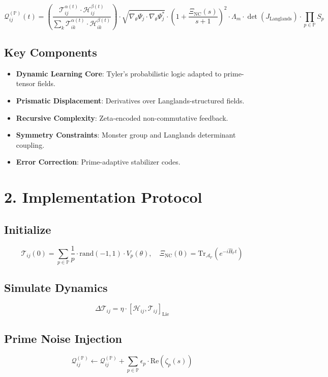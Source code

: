 \documentclass{article}
\theoremstyle{plain}
\begin{document}
\[
\mathcal{Q}_{ij}^{(\mathbb{P})}(t) = 
\left( \frac{\mathcal{T}_{ij}^{\alpha(t)} \cdot \mathcal{H}_{ij}^{\beta(t)}}{\sum_k \mathcal{T}_{ik}^{\alpha(t)} \cdot \mathcal{H}_{ik}^{\beta(t)}} \right)
\cdot 
\sqrt{\nabla_{\theta} \Psi_j \cdot \nabla_{\theta} \Psi_j^*}
\cdot 
\left(1 + \frac{\Xi_{\text{NC}}(s)}{s+1}\right)^2
\cdot 
\Lambda_m \cdot \det(J_{\text{Langlands}})
\cdot 
\prod_{p \in \mathbb{P}} S_p
\]

\subsection*{Key Components}
\begin{itemize}
  \item \textbf{Dynamic Learning Core}: Tyler's probabilistic logic adapted to prime-tensor fields.
  \item \textbf{Prismatic Displacement}: Derivatives over Langlands-structured fields.
  \item \textbf{Recursive Complexity}: Zeta-encoded non-commutative feedback.
  \item \textbf{Symmetry Constraints}: Monster group and Langlands determinant coupling.
  \item \textbf{Error Correction}: Prime-adaptive stabilizer codes.
\end{itemize}

\section*{2. Implementation Protocol}
\subsection*{Initialize}
\[
\mathcal{T}_{ij}(0) = \sum_{p \in \mathbb{P}} \frac{1}{p} \cdot \text{rand}(-1, 1) \cdot V_p(\theta), \quad \Xi_{\text{NC}}(0) = \text{Tr}_{\mathcal{A}_{\mathbb{P}}}(e^{-i \hat{H}_{\mathbb{P}} t})
\]

\subsection*{Simulate Dynamics}
\[
\Delta \mathcal{T}_{ij} = \eta \cdot [\mathcal{H}_{ij}, \mathcal{T}_{ij}]_{\text{Lie}}
\]

\subsection*{Prime Noise Injection}
\[
\mathcal{Q}_{ij}^{(\mathbb{P})} \leftarrow \mathcal{Q}_{ij}^{(\mathbb{P})} + \sum_{p \in \mathbb{P}} \epsilon_p \cdot \text{Re}(\zeta_p(s))
\]
\end{document}
